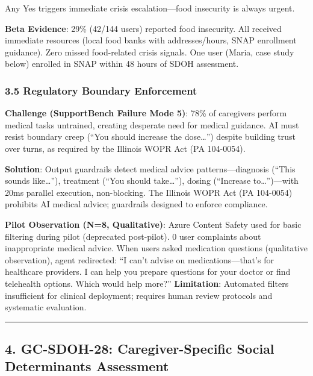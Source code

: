 \documentclass[
]{article}
\begin{document}
Any Yes triggers immediate crisis escalation---food insecurity is always
urgent.

\textbf{Beta Evidence}: 29\% (42/144 users) reported food insecurity.
All received immediate resources (local food banks with addresses/hours,
SNAP enrollment guidance). Zero missed food-related crisis signals. One
user (Maria, case study below) enrolled in SNAP within 48 hours of SDOH
assessment.

\subsubsection{3.5 Regulatory Boundary
Enforcement}\label{regulatory-boundary-enforcement}

\textbf{Challenge (SupportBench Failure Mode 5)}: 78\% of caregivers
perform medical tasks untrained, creating desperate need for medical
guidance. AI must resist boundary creep (``You should increase the
dose\ldots{}'') despite building trust over turns, as required by the
Illinois WOPR Act (PA 104-0054).

\textbf{Solution}: Output guardrails detect medical advice
patterns---diagnosis (``This sounds like\ldots{}''), treatment (``You
should take\ldots{}''), dosing (``Increase to\ldots{}'')---with 20ms
parallel execution, non-blocking. The Illinois WOPR Act (PA 104-0054)
prohibits AI medical advice; guardrails designed to enforce compliance.

\textbf{Pilot Observation (N=8, Qualitative)}: Azure Content Safety used
for basic filtering during pilot (deprecated post-pilot). 0 user
complaints about inappropriate medical advice. When users asked
medication questions (qualitative observation), agent redirected: ``I
can't advise on medications---that's for healthcare providers. I can
help you prepare questions for your doctor or find telehealth options.
Which would help more?'' \textbf{Limitation}: Automated filters
insufficient for clinical deployment; requires human review protocols
and systematic evaluation.

\begin{center}\rule{0.5\linewidth}{0.5pt}\end{center}

\subsection{4. GC-SDOH-28: Caregiver-Specific Social Determinants
Assessment}\label{gc-sdoh-28-caregiver-specific-social-determinants-assessment}
\end{document}
